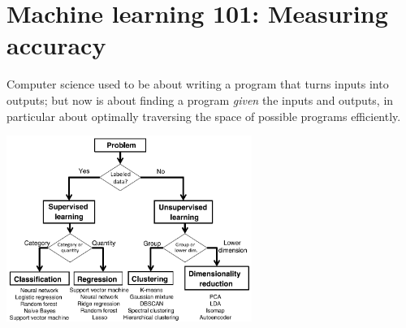 \documentclass{article}
\begin{document}
\newpage
\section{Machine learning 101: Measuring accuracy}
Computer science used to be about writing a program that turns inputs into outputs; but now is about finding a program \textit{given} the inputs and outputs, in particular about optimally traversing the space of possible programs efficiently.

\vspace{-0.2cm}
\begin{center}
    \includegraphics[width=0.6\textwidth]{MLtree.png}
\end{center}
\vspace{-0.3cm}
\end{document}

